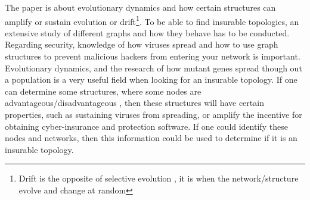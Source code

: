  The paper \cite{lieberman2005evolutionary} is about evolutionary dynamics and how certain structures
can amplify or sustain evolution or drift\footnote{Drift is the opposite of selective evolution
, it is when the network/structure evolve and change at random}. To be able to find insurable topologies, an extensive study of different graphs and how they behave has to be conducted. Regarding security, knowledge of how viruses spread and how to use graph structures to prevent malicious hackers from entering your network is important. Evolutionary dynamics, and the research of how mutant genes spread though out a population is a very useful field when looking for an insurable topology. 
If one can determine some structures, where some nodes are advantageous/disadvantageous , then these structures will have certain properties, such as sustaining viruses from spreading, or amplify the incentive for obtaining cyber-insurance and
protection software. If one could identify these nodes and networks, then this information could  be used to determine if it is an insurable topology.

